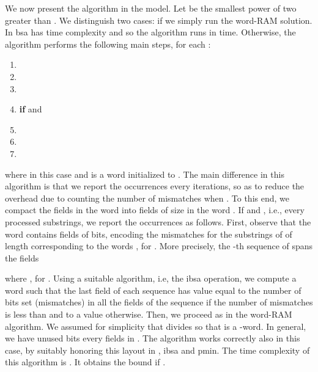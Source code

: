\documentclass{llncs}
\newcommand{\fsize}{f}
\newcommand{\acbound}{\xspace}
\newcommand{\fword}[1]{-word}
\begin{document}
We now present the algorithm in the  model. Let  be the
smallest power of two greater than . We distinguish two cases: if
 we simply run the word-RAM solution. In
 \textsf{bsa} has  time complexity and so the
algorithm runs in  time.
Otherwise, the algorithm performs the following main steps, for each
:
\begin{enumerate}
\item 
\item 
\item 
\item \textbf{if}  and 
\item \qquad 
\item \qquad 
\item \qquad 
\end{enumerate}
where in this case  and  is a word initialized to .
The main difference in this algorithm is that we
report the occurrences every  iterations,
so as to reduce the overhead due to counting the number of mismatches when . To this end, we
compact the fields in the word 
into fields of size  in the word . If  and
, i.e., every
 processed substrings, we report the
occurrences as follows. First, observe that the word  contains
 fields of  bits,
encoding the mismatches for the substrings of  of length 
corresponding to the words , for
. More precisely, the -th
sequence of  spans the
fields

where , for
. Using a suitable algorithm, i.e, the \textsf{ibsa}
operation, we compute a word such that the last field of each sequence
has value equal to the number of bits set (mismatches) in all the
fields of the sequence if the number of mismatches is less than
 and to a value  otherwise. Then, we proceed as in the word-RAM algorithm.
We assumed for simplicity that  divides  so that
 is a \fword{\fsize}. In general, we have 
unused bits every  fields in . The
algorithm works correctly also in this case, by suitably honoring this
layout in , \textsf{ibsa} and \textsf{pmin}.
The time complexity of this algorithm is \acbound. It obtains the
 bound if .
\end{document}
